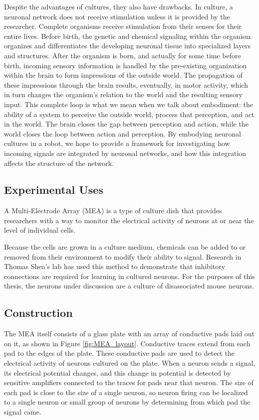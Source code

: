 \documentclass[letterpaper]{article}
\begin{document}
Despite the advantages of cultures, they also have drawbacks. 
In culture, a neuronal network does not receive stimulation unless it is provided by the researcher. 
Complete organisms receive stimulation from their senses for their entire lives. 
Before birth, the genetic and chemical signaling within the organism organizes and differentiates the developing neuronal tissue into specialized layers and structures. 
After the organism is born, and actually for some time before birth, incoming sensory information is handled by the pre-existing organization within the brain to form impressions of the outside world. 
The propagation of these impressions through the brain results, eventually, in motor activity, which in turn changes the organism's relation to the world and the resulting sensory input. 
This complete loop is what we mean when we talk about embodiment: the ability of a system to perceive the outside world, process that perception, and act in the world. 
The brain closes the gap between perception and action, while the world closes the loop between action and perception. 
By embodying neuronal cultures in a robot, we hope to provide a framework for investigating how incoming signals are integrated by neuronal networks, and how this integration affects the structure of the network. 

\subsection{Experimental Uses}

A Multi-Electrode Array (MEA) is a type of culture dish that provides researchers with a way to monitor the electrical activity of neurons at or near the level of individual cells. 

Because the cells are grown in a culture medium, chemicals can be added to or removed from their environment to modify their ability to signal. 
Research in Thomas Shea's lab \cite{shea2009optimization} has used this method to demonstrate that inhibitory connections are required for learning in cultured neurons. 
For the purposes of this thesis, the neurons under discussion are a culture of disassociated mouse neurons.   

\subsection{Construction}
The MEA itself consists of a glass plate with an array of conductive pads laid out on it, as shown in Figure \ref{fig:MEA_layout}.
Conductive traces extend from each pad to the edges of the plate. 
These conductive pads are used to detect the electrical activity of neurons cultured on the plate.
When a neuron sends a signal, its electrical potential changes, and this change in potential is detected by sensitive amplifiers connected to the traces for pads near that neuron.
The size of each pad is close to the size of a single neuron, so neuron firing can be localized to a single neuron or small group of neurons by determining from which pad the signal came.
\end{document}
